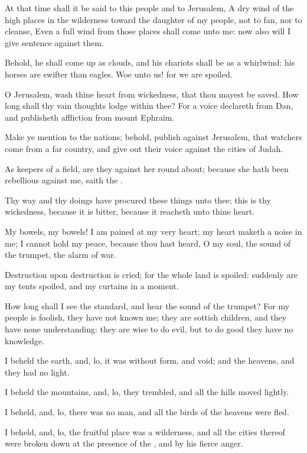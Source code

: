 \verse At that time shall it be said to this people and to Jerusalem, A dry wind of the high places in the wilderness toward the daughter of my people, not to fan, nor to cleanse, \verse Even a full wind from those places shall come unto me: now also will I give sentence against them.

\verse Behold, he shall come up as clouds, and his chariots shall be as a whirlwind: his horses are swifter than eagles. Woe unto us! for we are spoiled.

\verse O Jerusalem, wash thine heart from wickedness, that thou mayest be saved. How long shall thy vain thoughts lodge within thee?  \verse For a voice declareth from Dan, and publisheth affliction from mount Ephraim.

\verse Make ye mention to the nations; behold, publish against Jerusalem, that watchers come from a far country, and give out their voice against the cities of Judah.

\verse As keepers of a field, are they against her round about; because she hath been rebellious against me, saith the \LORD.

\verse Thy way and thy doings have procured these things unto thee; this is thy wickedness, because it is bitter, because it reacheth unto thine heart.

\verse My bowels, my bowels! I am pained at my very heart; my heart maketh a noise in me; I cannot hold my peace, because thou hast heard, O my soul, the sound of the trumpet, the alarm of war.

\verse Destruction upon destruction is cried; for the whole land is spoiled: suddenly are my tents spoiled, and my curtains in a moment.

\verse How long shall I see the standard, and hear the sound of the trumpet?  \verse For my people is foolish, they have not known me; they are sottish children, and they have none understanding: they are wise to do evil, but to do good they have no knowledge.

\verse I beheld the earth, and, lo, it was without form, and void; and the heavens, and they had no light.

\verse I beheld the mountains, and, lo, they trembled, and all the hills moved lightly.

\verse I beheld, and, lo, there was no man, and all the birds of the heavens were fled.

\verse I beheld, and, lo, the fruitful place was a wilderness, and all the cities thereof were broken down at the presence of the \LORD, and by his fierce anger.

